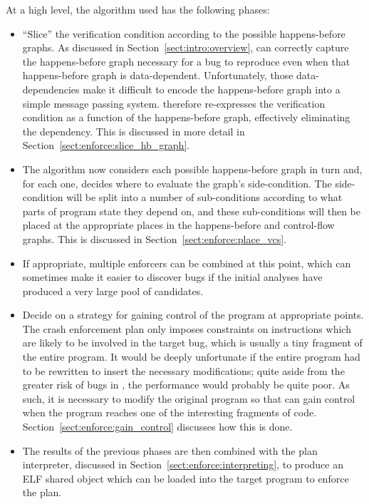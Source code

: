 At a high level, the algorithm used has the following phases:

\begin{itemize}
\item
  ``Slice'' the verification condition according to the possible
  happens-before graphs. As discussed in
  Section~\ref{sect:intro:overview}, {\technique} can correctly
  capture the happens-before graph necessary for a bug to reproduce
  even when that happens-before graph is data-dependent.
  Unfortunately, those data-dependencies make it difficult to encode
  the happens-before graph into a simple message passing system.
  {\Technique} therefore re-expresses the verification condition as a
  function of the happens-before graph, effectively eliminating the
  dependency.  This is discussed in more detail in
  Section~\ref{sect:enforce:slice_hb_graph}.
\item
  The algorithm now considers each possible happens-before graph in
  turn and, for each one, decides where to evaluate the graph's
  side-condition.  The side-condition will be split into a number of
  sub-conditions according to what parts of program state they depend
  on, and these sub-conditions will then be placed at the appropriate
  places in the happens-before and control-flow graphs.  This is
  discussed in Section~\ref{sect:enforce:place_vcs}.
\item
  If appropriate, multiple enforcers can be combined at this point,
  which can sometimes make it easier to discover bugs if the initial
  analyses have produced a very large pool of candidates.
\item
  Decide on a strategy for gaining control of the program at
  appropriate points.  The crash enforcement plan only imposes
  constraints on instructions which are likely to be involved in the
  target bug, which is usually a tiny fragment of the entire program.
  It would be deeply unfortunate if the entire program had to be
  rewritten to insert the necessary modifications; quite aside from
  the greater risk of bugs in {\implementation}, the performance would
  probably be quite poor.  As such, it is necessary to modify the
  original program so that {\technique} can gain control when the
  program reaches one of the interesting fragments of code.
  Section~\ref{sect:enforce:gain_control} discusses how this is done.

\item
  The results of the previous phases are then combined with the plan
  interpreter, discussed in Section~\ref{sect:enforce:interpreting},
  to produce an ELF shared object which can be loaded into the target
  program to enforce the plan.
\end{itemize}

